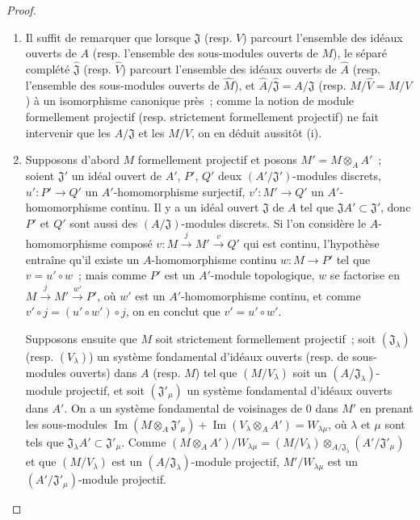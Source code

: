 \begin{proof}
\begin{enumerate}
  \item[(i)] Il suffit de remarquer que lorsque $\mathfrak J$ (resp. $V$)
  parcourt l'ensemble des idéaux ouverts de $A$ (resp. l'ensemble des
  sous-modules ouverts de $M$), le séparé complété $\hat{\mathfrak J}$
  (resp. $\hat V$) parcourt l'ensemble des idéaux ouverts de $\hat A$
  (resp. l'ensemble des sous-modules ouverts de $\hat M$), et
  $\hat A/\hat{\mathfrak J}=A/\mathfrak J$ (resp.
  $\hat M/\hat V=M/V$) à un isomorphisme canonique près~; comme la notion
  de module formellement projectif (resp. strictement formellement projectif)
  ne fait intervenir que les $A/\mathfrak J$ et les $M/V$, on en déduit
  aussitôt (i).
  \item[(ii)] Supposons d'abord $M$ formellement projectif et posons
  $M'=M\otimes_A A'$~; soient $\mathfrak J'$ un idéal ouvert de $A'$, $P'$,
  $Q'$ deux $(A'/\mathfrak J')$-modules discrets, $u':P'\to Q'$ un
  $A'$-homomorphisme surjectif, $v':M'\to Q'$ un $A'$-homomorphisme continu.
  Il y a un idéal ouvert $\mathfrak J$ de $A$ tel que
  $\mathfrak JA'\subset\mathfrak J'$, donc $P'$ et $Q'$ sont aussi des
  $(A/\mathfrak J)$-modules discrets. Si l'on considère le
  $A$-homomorphisme composé $v:M\xrightarrow{j}M'\xrightarrow{v}Q'$ qui est
  continu, l'hypothèse entraîne qu'il existe un $A$-homomorphisme continu
  $w:M\to P'$ tel que $v=u'\circ w$~; mais comme $P'$ est un $A'$-module
  topologique, $w$ se factorise en
  $M\xrightarrow{j}M'\xrightarrow{w'}P'$, où $w'$ est un $A'$-homomorphisme
  continu, et comme $v'\circ j=(u'\circ w')\circ j$, on en conclut que
  $v'=u'\circ w'$.

  Supposons ensuite que $M$ soit strictement formellement projectif~; soit
  $(\mathfrak J_\lambda)$ (resp. $(V_\lambda)$) un système fondamental
  d'idéaux ouverts (resp. de sous-modules ouverts) dans $A$ (resp. $M$) tel
  que $(M/V_\lambda)$ soit un $(A/\mathfrak J_\lambda)$-module projectif,
  et soit $(\mathfrak J'_\mu)$ un système fondamental d'idéaux ouverts dans
  $A'$. On a un système fondamental de voisinages de $0$ dans $M'$ en prenant
  les sous-modules
  $\operatorname{Im}(M\otimes_A\mathfrak J'_\mu)
    +\operatorname{Im}(V_\lambda\otimes_A A')=W_{\lambda\mu}$,
  où $\lambda$ et $\mu$ sont tels que
  $\mathfrak J_\lambda A'\subset\mathfrak J'_\mu$. Comme
  $(M\otimes_A A')/W_{\lambda\mu}
    =(M/V_\lambda)\otimes_{A/\mathfrak J_\lambda}
      (A'/\mathfrak J'_\mu)$
  et que $(M/V_\lambda)$ est un
  $(A/\mathfrak J_\lambda)$-module projectif, $M'/W_{\lambda\mu}$
  est un $(A'/\mathfrak J'_\mu)$-module projectif.
\end{enumerate}
\end{proof}

